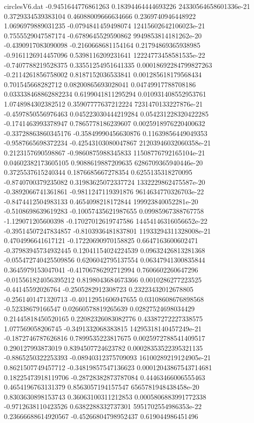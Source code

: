 \begin{filecontents}{circlesV6.dat}
-0.9451644776861263	0.18394464444693226	24330564658601336e-21
0.3729334539383104	0.46088009666634666	0.2369740946448922
1.0696979889031235	-0.0794841459498074	12415602642106023e-21
0.7555529047587174	-0.6789645529590862	9949853814181262e-20
-0.4390917083090098	-0.2160668681154164	0.21794869365938985
-0.9161126914457096	0.5398116209231641	12224773458581535e-22
-0.7407788219528375	0.33551254951641335	0.00018692284799827263
-0.2114261856758002	0.8187152036533841	0.001285618179568434
0.701545668282712	0.08200865693028041	0.04749917788708186
0.033338468862882234	0.6199041811295294	0.010931408552953761
1.0748984302382512	0.35907777637212224	7231470133227876e-21
-0.4597850556976463	0.045223030444219284	0.054231228320422285
-0.1741463993378947	0.7865778186239607	0.0025918976220400632
-0.33728863860345176	-0.35849990456630876	0.11639856449049353
-0.9587665698372234	-0.42543103080047867	21203946032060358e-21
0.2123157690598867	-0.9860875988345833	11508776792165104e-21
0.04602382173605105	0.9088619887209635	6286709365940446e-20
0.3725537615240344	0.1876685667278354	0.6255135318270095
-0.8740700379235082	0.31983625072337724	1332229862475587e-20
-0.3892066741361861	-0.9811247119391876	9614634770326703e-22
-0.8474412504983133	0.4654098218172844	199923840052281e-20
-0.5108698639619283	-0.10057435621987655	0.09985967388767758
-1.129071205600398	-0.17027012619747586	14454146316056652e-22
-0.39514507247834857	-0.8103936481837801	11933294311328008e-21
0.4704996641617121	-0.17220690970158825	0.6647163600602471
-0.37983945734932445	0.12041154024224539	0.09632426813281368
-0.055472740425509856	0.6206042795137554	0.06347941300835844
0.3645979153047041	-0.41706786292712994	0.7606602260647296
-0.015561824056395212	0.8198043684673366	0.0010286277223525
-0.44145592026764	-0.2505282912308723	0.23223432012678805
-0.2561401471320713	-0.40112951606947655	0.03108608676898568
-0.52338679166547	0.02660578819265639	0.02827524698034429
0.21445818450520165	0.22082326083082776	0.43387272227338575
1.077569058206745	-0.3491332068383815	14295318140457249e-21
-0.1872746787626816	0.7899535223817675	0.0025972788541409517
0.290127993873019	0.8394507724623782	0.00028353522395321135
-0.8865250322253393	-0.08940312375709093	16100289219124905e-21
0.8621507749457712	-0.34819857547136623	0.00012043867543714681
0.18225473918119706	-0.28728382873787084	0.44463466006555463
0.4654196763131379	0.8563057194157547	6565781948438458e-20
0.8303630898153743	0.36063100311212853	0.0005806883991772338
-0.9712638110423526	0.6382288332737301	5951702554986353e-22
0.23666688614920567	-0.45266804798952437	0.619044986451496

\end{filecontents}
